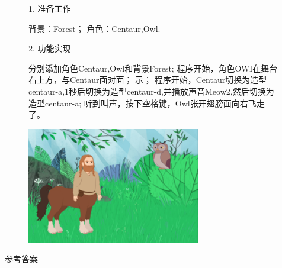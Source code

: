 \documentclass[10.5pt, a4paper]{article}
\begin{document}
\begin{enumerate}
        \begin{figure}[htbp]
            \begin{minipage}{.6\textwidth}
                1. 准备工作
                \begin{tasks}[label = (\arabic*)]
                    \task 背景：Forest；
                    \task 角色：Centaur,Owl.
                \end{tasks}
                2. 功能实现
                \begin{tasks}[label = (\arabic*)]
                    \task 分别添加角色Centaur,Owl和背景Forest;
                    \task 程序开始，角色OWI在舞台右上方，与Centaur面对面；
                    示；
                    \task 程序开始，Centaur切换为造型centaur-a,1秒后切换为造型centaur-d,并播放声音Meow2,然后切换为造型centaur-a;
                    \task 听到叫声，按下空格键，Owl张开翅膀面向右飞走了。
                \end{tasks}
            \end{minipage}
            \begin{minipage}{.37\textwidth}
                \centering
                \includegraphics[width=\textwidth]{37.png}
            \end{minipage}
        \end{figure}
        \vfill
    \end{enumerate}

    \newpage
    \begin{center}
        \Huge \heiti 参考答案
    \end{center}
\end{document}
